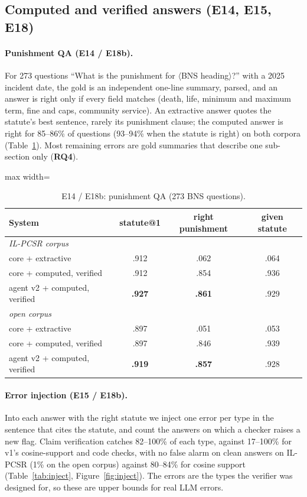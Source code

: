 \documentclass[sigconf,nonacm]{acmart}
\begin{document}
\subsection{Computed and verified answers (E14, E15, E18)}

\paragraph{Punishment QA (E14 / E18b).} For 273 questions ``What is the punishment for
$\langle$BNS heading$\rangle$?'' with a 2025 incident date, the gold is an independent one-line
summary, parsed, and an answer is right only if every field matches (death, life, minimum and
maximum term, fine and caps, community service). An extractive answer quotes the statute's best
sentence, rarely its punishment clause; the computed answer is right for 85--86\% of questions
(93--94\% when the statute is right) on both corpora (Table~\ref{tab:answers}). Most remaining
errors are gold summaries that describe one sub-section only (\textbf{RQ4}).

\begin{table}[t]
\centering\small
\caption{E14 / E18b: punishment QA (273 BNS questions).}
\label{tab:answers}
\begin{adjustbox}{max width=\linewidth}
\begin{tabular}{lccc}
\toprule
System & statute@1 & right punishment & given statute \\
\midrule
\multicolumn{4}{l}{\emph{IL-PCSR corpus}} \\
core + extractive & .912 & .062 & .064 \\
core + computed, verified & .912 & .854 & .936 \\
agent v2 + computed, verified & \textbf{.927} & \textbf{.861} & .929 \\
\multicolumn{4}{l}{\emph{open corpus}} \\
core + extractive & .897 & .051 & .053 \\
core + computed, verified & .897 & .846 & .939 \\
agent v2 + computed, verified & \textbf{.919} & \textbf{.857} & .928 \\
\bottomrule
\end{tabular}
\end{adjustbox}
\end{table}

\paragraph{Error injection (E15 / E18b).} Into each answer with the right statute we inject one
error per type in the sentence that cites the statute, and count the answers on which a checker
raises a new flag. Claim verification catches 82--100\% of each type, against 17--100\% for v1's
cosine-support and code checks, with no false alarm on clean answers on IL-PCSR (1\% on the open
corpus) against 80--84\% for cosine support (Table~\ref{tab:inject}, Figure~\ref{fig:inject}). The
errors are the types the verifier was designed for, so these are upper bounds for real LLM errors.
\end{document}
